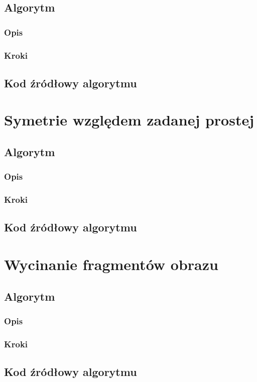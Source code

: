 \documentclass[a4paper,12pt]{book}
\begin{document}
\subsection*{Algorytm}
\subsubsection*{Opis}
\subsubsection*{Kroki}
\subsection*{Kod źródłowy algorytmu}
\section{Symetrie względem zadanej prostej}
\subsection*{Algorytm}
\subsubsection*{Opis}
\subsubsection*{Kroki}
\subsection*{Kod źródłowy algorytmu}
\section{Wycinanie fragmentów obrazu}
\subsection*{Algorytm}
\subsubsection*{Opis}
\subsubsection*{Kroki}
\subsection*{Kod źródłowy algorytmu}
\end{document}
